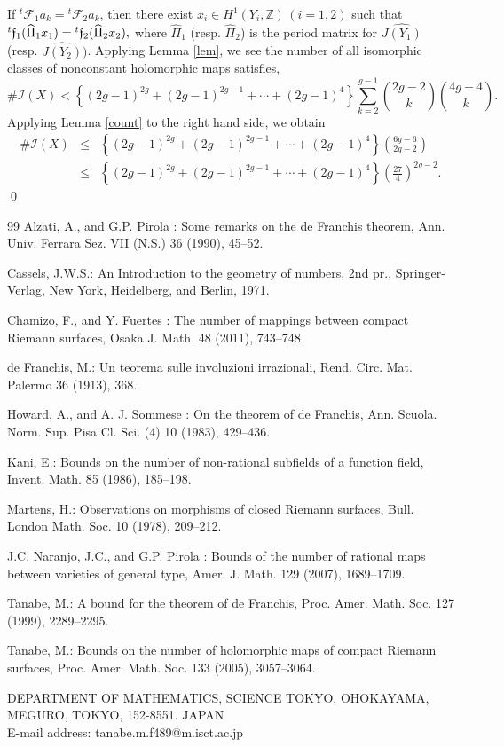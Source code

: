 \documentclass[11pt]{article}
\numberwithin{equation}{section}
\theoremstyle{plain}
\begin{document}
 If ${}^t\mathcal{F}_{1}a_{k}={}^t\mathcal{F}_{2}a_{k}$, then there exist $x_{i}\in H^{1}(Y_{i},\mathbb{Z}) \,(i=1,2)$ such that $^{t}{\frak f}_{1}( \widehat{\Pi}_{1}x_{1}) = {^{t}{\frak f}_{2}( \widehat{\Pi}_{2}x_{2})},$ where $ \widehat{\Pi}_{1}$ (resp. $ \widehat{\Pi}_{2}$) is the period matrix for $ \widehat{J(Y_{1})}$ (resp. $ \widehat{J(Y_{2})})$. Applying Lemma \ref{lem}, 
  we see the number of all isomorphic classes of nonconstant holomorphic maps  satisfies, 
\begin{equation*}
\#\mathcal{I}(X)<\left\{ \left(2g-1\right)^{2g}
+\left(2g-1\right)^{2g-1}+\cdots +\left(2g-1\right)^{4}\right\} \sum_{k=2}^{g-1} \binom{2g-2}{k} \binom{4g-4}{k}. \end{equation*}
Applying Lemma \ref{count} to the right hand side, we obtain
\begin{eqnarray*}
\#\mathcal{I}(X)&\le& 
\left\{ \left(2g-1\right)^{2g}
+\left(2g-1\right)^{2g-1}+\cdots +\left(2g-1\right)^{4}\right\}  \binom{6g-6}{2g-2}\\
&\le&
\left\{ \left(2g-1\right)^{2g}
+\left(2g-1\right)^{2g-1}+\cdots +\left(2g-1\right)^{4}\right\}  \left( \frac{27}{4} \right)^{2g-2}.
\end{eqnarray*}
\qed


\begin{thebibliography}{99}
Alzati, A., and G.P. Pirola : Some remarks on the de Franchis theorem, Ann. Univ. Ferrara Sez. VII (N.S.) 36 (1990), 45--52. 
    
        
Cassels, J.W.S.: An Introduction to the geometry of numbers, 2nd pr., Springer-Verlag, New York, Heidelberg, and Berlin, 1971. 
    
    Chamizo, F., and Y. Fuertes : The number of mappings between compact
    Riemann surfaces,
Osaka J. Math.
48 (2011), 743--748

     de Franchis, M.: Un teorema sulle involuzioni irrazionali, Rend. Circ. Mat. Palermo 36 (1913), 368. 
    
     Howard, A., and A. J. Sommese : On the theorem of de Franchis, Ann. Scuola. Norm. Sup. Pisa Cl. Sci. (4) 10 (1983), 429--436. 
    
     Kani, E.: Bounds on the number of non-rational subfields of a function field, Invent. Math. 85 (1986), 185--198. 
        
     Martens, H.: Observations on morphisms of closed Riemann surfaces, Bull. London Math. Soc. 10 (1978), 209--212.
    
      J.C. Naranjo, J.C., and G.P. Pirola : Bounds of the number of rational maps between varieties of general type, Amer. J. Math. 129 (2007), 1689--1709.
    
    Tanabe, M.: A bound for the theorem of de Franchis, Proc. Amer. Math. Soc. 127 (1999), 2289--2295. 
       
     Tanabe, M.: Bounds on the number of holomorphic maps of compact Riemann surfaces, Proc. Amer. Math. Soc. 133 (2005), 3057--3064. 
  
\end{thebibliography}

\vspace{0.4cm}
 \footnotesize{DEPARTMENT OF MATHEMATICS, SCIENCE TOKYO,
  OHOKAYAMA, MEGURO, TOKYO, 152-8551. JAPAN}  \\
\footnotesize{E-mail address: tanabe.m.f489@m.isct.ac.jp} 
\end{document}
